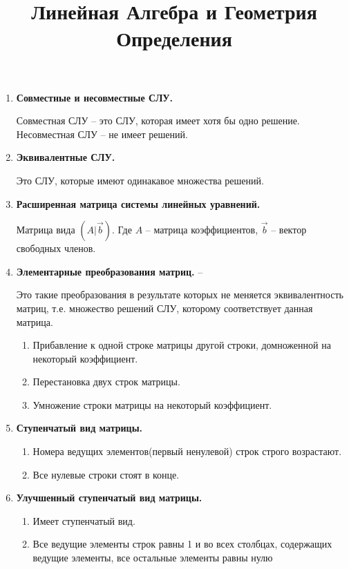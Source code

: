 

\title{Линейная Алгебра и Геометрия\\Определения}

\maketitle

\begin{enumerate}
\item \textbf{Совместные и несовместные СЛУ.} 

Совместная СЛУ -- это СЛУ, которая имеет хотя бы одно решение. \\
Несовместная СЛУ -- не имеет решений. 

\item \textbf{Эквивалентные СЛУ.} 

Это СЛУ, которые имеют одинакавое множества решений.

\item \textbf{Расширенная матрица системы линейных уравнений.} 
 
Матрица вида $(A | \vec b)$. Где $A$ -- матрица коэффициентов, $\vec b$ -- вектор свободных членов.

\item \textbf{Элементарные преобразования матриц.}  --

Это такие преобразования в результате которых не меняется эквивалентность матриц, т.е. множество решений СЛУ, которому соответствует данная матрица. 
\begin{enumerate}
	\item Прибавление к одной строке матрицы другой строки, домноженной на некоторый коэффициент.
	\item Перестановка двух строк матрицы.
	\item Умножение строки матрицы на некоторый коэффициент.
\end{enumerate}

\item \textbf{Ступенчатый вид матрицы.}
\begin{enumerate}
	\item Номера ведущих элементов(первый ненулевой) строк строго возрастают.
	\item Все нулевые строки стоят в конце.
\end{enumerate}

\item \textbf{Улучшенный ступенчатый вид матрицы.}

\begin{enumerate}
	\item Имеет ступенчатый вид.
	\item Все ведущие элементы строк равны 1 и во всех столбцах, содержащих ведущие элементы, все остальные элементы равны нулю
\end{enumerate}


\end{enumerate}
